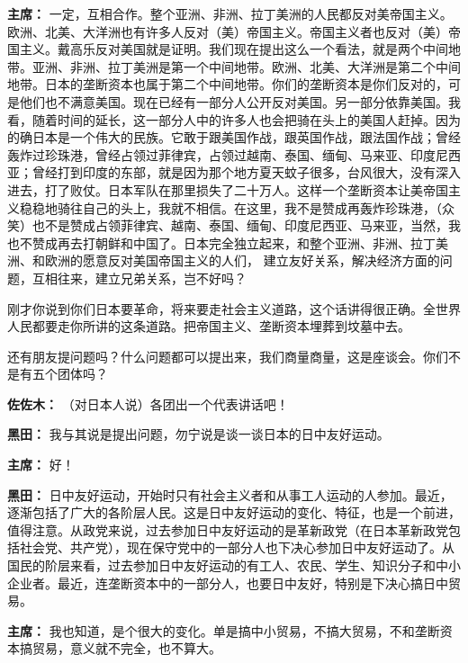\begin{duihua}
\item[\textbf{主席：}] 一定，互相合作。整个亚洲、非洲、拉丁美洲的人民都反对美帝国主义。欧洲、北美、大洋洲也有许多人反对（美）帝国主义。帝国主义者也反对（美）帝国主义。戴高乐反对美国就是证明。我们现在提出这么一个看法，就是两个中间地带。亚洲、非洲、拉丁美洲是第一个中间地带。欧洲、北美、大洋洲是第二个中间地带。日本的垄断资本也属于第二个中间地带。你们的垄断资本是你们反对的，可是他们也不满意美国。现在已经有一部分人公开反对美国。另一部分依靠美国。我看，随着时间的延长，这一部分人中的许多人也会把骑在头上的美国人赶掉。因为的确日本是一个伟大的民族。它敢于跟美国作战，跟英国作战，跟法国作战；曾经轰炸过珍珠港，曾经占领过菲律宾，占领过越南、泰国、缅甸、马来亚、印度尼西亚；曾经打到印度的东部，就是因为那个地方夏天蚊子很多，台风很大，没有深入进去，打了败仗。日本军队在那里损失了二十万人。这样一个垄断资本让美帝国主义稳稳地骑往自己的头上，我就不相信。在这里，我不是赞成再轰炸珍珠港，（众笑）也不是赞成占领菲律宾、越南、泰国、缅甸、印度尼西亚、马来亚，当然，我也不赞成再去打朝鲜和中国了。日本完全独立起来，和整个亚洲、非洲、拉丁美洲、和欧洲的愿意反对美国帝国主义的人们， 建立友好关系，解决经济方面的问题，互相往来，建立兄弟关系，岂不好吗？

刚才你说到你们日本要革命，将来要走社会主义道路，这个话讲得很正确。全世界人民都要走你所讲的这条道路。把帝国主义、垄断资本埋葬到坟墓中去。

还有朋友提问题吗？什么问题都可以提出来，我们商量商量，这是座谈会。你们不是有五个团体吗？

\item[\textbf{佐佐木：}] （对日本人说）各团出一个代表讲话吧！

\item[\textbf{黑田：}] 我与其说是提出问题，勿宁说是谈一谈日本的日中友好运动。

\item[\textbf{主席：}] 好！

\item[\textbf{黑田：}] 日中友好运动，开始时只有社会主义者和从事工人运动的人参加。最近，逐渐包括了广大的各阶层人民。这是日中友好运动的变化、特征，也是一个前进，值得注意。从政党来说，过去参加日中友好运动的是革新政党（在日本革新政党包括社会党、共产党），现在保守党中的一部分人也下决心参加日中友好运动了。从国民的阶层来看，过去参加日中友好运动的有工人、农民、学生、知识分子和中小企业者。最近，连垄断资本中的一部分人，也要日中友好，特别是下决心搞日中贸易。

\item[\textbf{主席：}] 我也知道，是个很大的变化。单是搞中小贸易，不搞大贸易，不和垄断资本搞贸易，意义就不完全，也不算大。


\end{duihua}
